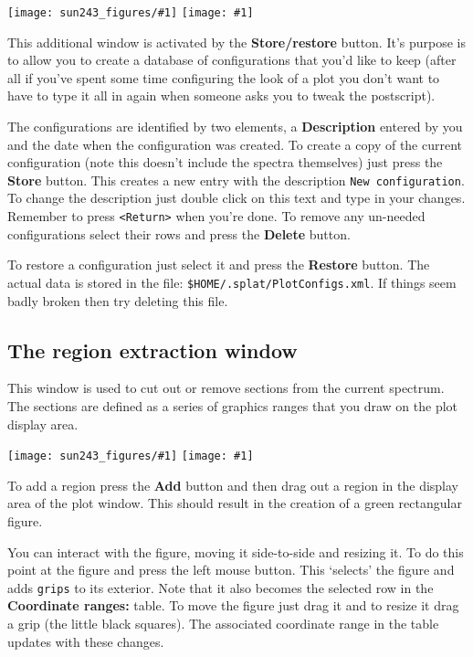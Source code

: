 \documentclass[twoside,11pt,nolof]{starlink}
\providecommand{\mainfigure}[1]
{\begin{center}
    \ifpdf
    \texttt{[image: sun243\_figures/\#1]}
    \else
    \texttt{[image: \#1]}
    \fi
 \end{center}
}
\newcommand{\labelitem}[1]{\textbf{#1}}
\providecommand{\hitext}[1]{\texttt{#1}}
\begin{document}
\mainfigure{restorewindow}

This additional window is activated by the \labelitem{Store/restore}
button. It's purpose is to allow you to create a database of configurations
that you'd like to keep (after all if you've spent some time configuring the
look of a plot you don't want to have to type it all in again when someone
asks you to tweak the postscript).

The configurations are identified by two elements, a
\labelitem{Description} entered by you and the date when the
configuration was created. To create a copy of the current configuration
(note this doesn't include the spectra themselves) just press the
\labelitem{Store} button. This creates a new entry with the description
\hitext{New configuration}. To change the description just double
click on this text and type in your changes. Remember to press
\hitext{<Return>} when you're done. To remove any un-needed
configurations select their rows and press the \labelitem{Delete}
button.

To restore a configuration just select it and press the
\labelitem{Restore} button. The actual data is stored in the file:
\hitext{\$HOME/.splat/PlotConfigs.xml}. If things seem badly broken
then try deleting this file.

\newpage
\subsection{The region extraction window}

This window is used to cut out or remove sections from the current
spectrum. The sections are defined as a series of graphics ranges that
you draw on the plot display area.

\mainfigure{cutterwindow}

To add a region press the \labelitem{Add} button and then drag out a
region in the display area of the plot window. This should result in
the creation of a green rectangular figure.

You can interact with the figure, moving it side-to-side and resizing
it. To do this point at the figure and press the left mouse
button. This `selects' the figure and adds \hitext{grips} to its
exterior. Note that it also becomes the selected row in the
\labelitem{Coordinate ranges:} table. To move the figure just drag it
and to resize it drag a grip (the little black squares). The
associated coordinate range in the table updates with these changes.
\end{document}
